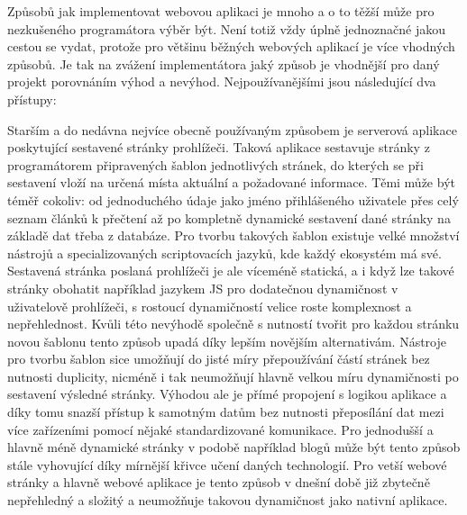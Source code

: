 \begin{itemize}
\begin{itemize}
	Způsobů jak implementovat webovou aplikaci je mnoho a o to těžší může pro nezkušeného programátora výběr být.
	Není totiž vždy úplně jednoznačné jakou cestou se vydat, protože pro většinu běžných webových aplikací je více
	vhodných způsobů.
	Je tak na zvážení implementátora jaký způsob je vhodnější pro daný projekt porovnáním výhod a nevýhod.
	Nejpoužívanějšími jsou následující dva přístupy:

	Starším a do nedávna nejvíce obecně používaným způsobem je serverová aplikace poskytující sestavené stránky
	prohlížeči.
	Taková aplikace sestavuje stránky z programátorem připravených šablon jednotlivých stránek, do kterých se při sestavení
	vloží na určená místa aktuální a požadované informace.
	Těmi může být téměř cokoliv: od jednoduchého údaje jako jméno přihlášeného uživatele přes celý seznam článků k přečtení
	až po kompletně dynamické sestavení dané stránky na základě dat třeba z databáze.
	Pro tvorbu takových šablon existuje velké množství nástrojů a specializovaných scriptovacích jazyků, kde každý
	ekosystém má své.
	Sestavená stránka poslaná prohlížeči je ale víceméně statická, a i když lze takové stránky obohatit například jazykem
	\ac{JS} pro dodatečnou dynamičnost v uživatelově prohlížeči, s rostoucí dynamičností velice roste komplexnost a nepřehlednost.
	Kvůli této nevýhodě společně s nutností tvořit pro každou stránku novou šablonu tento způsob upadá díky lepším novějším
	alternativám.
	Nástroje pro tvorbu šablon sice umožňují do jisté míry přepoužívání částí stránek bez nutnosti duplicity,
	nicméně i tak neumožňují hlavně velkou míru dynamičnosti po sestavení výsledné stránky.
	Výhodou ale je přímé propojení s logikou aplikace a díky tomu snazší přístup k samotným datům bez nutnosti přeposílání
	dat mezi více zařízeními pomocí nějaké standardizované komunikace.
	Pro jednodušší a hlavně méně dynamické stránky v podobě například blogů může být tento způsob stále vyhovující díky
	mírnější křivce učení daných technologií.
	Pro vetší webové stránky a hlavně webové aplikace je tento způsob v dnešní době již zbytečně nepřehledný a složitý a
	neumožňuje takovou dynamičnost jako nativní aplikace.


\end{itemize}
\end{itemize}
